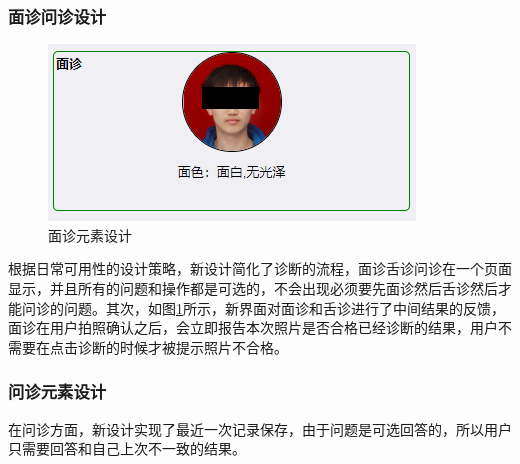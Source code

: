 \subsubsection{面诊问诊设计}

\begin{figure}[h]
    \centering
    \includegraphics[]{images/diag_design.png}
    \caption{面诊元素设计}
    \label{fig:diag_design}
\end{figure}

根据日常可用性的设计策略，新设计简化了诊断的流程，面诊舌诊问诊在一个页面显示，并且所有的问题和操作都是可选的，不会出现必须要先面诊然后舌诊然后才能问诊的问题。其次，如图\ref{fig:diag_design}所示，新界面对面诊和舌诊进行了中间结果的反馈，面诊在用户拍照确认之后，会立即报告本次照片是否合格已经诊断的结果，用户不需要在点击诊断的时候才被提示照片不合格。

\subsubsection{问诊元素设计}
在问诊方面，新设计实现了最近一次记录保存，由于问题是可选回答的，所以用户只需要回答和自己上次不一致的结果。

